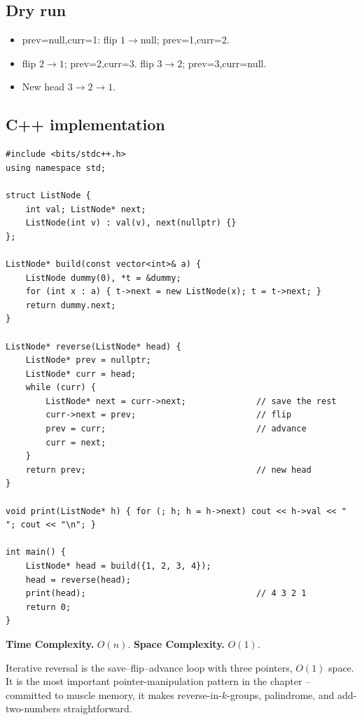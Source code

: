 \subsection*{Dry run}


\begin{itemize}
  \item prev=null,curr=1: flip $1\to$null; prev=1,curr=2.
  \item flip $2\to1$; prev=2,curr=3. flip $3\to2$; prev=3,curr=null.
  \item New head $3\to2\to1$.
\end{itemize}

\subsection*{C++ implementation}

\begin{lstlisting}
#include <bits/stdc++.h>
using namespace std;

struct ListNode {
    int val; ListNode* next;
    ListNode(int v) : val(v), next(nullptr) {}
};

ListNode* build(const vector<int>& a) {
    ListNode dummy(0), *t = &dummy;
    for (int x : a) { t->next = new ListNode(x); t = t->next; }
    return dummy.next;
}

ListNode* reverse(ListNode* head) {
    ListNode* prev = nullptr;
    ListNode* curr = head;
    while (curr) {
        ListNode* next = curr->next;              // save the rest
        curr->next = prev;                        // flip
        prev = curr;                              // advance
        curr = next;
    }
    return prev;                                  // new head
}

void print(ListNode* h) { for (; h; h = h->next) cout << h->val << " "; cout << "\n"; }

int main() {
    ListNode* head = build({1, 2, 3, 4});
    head = reverse(head);
    print(head);                                  // 4 3 2 1
    return 0;
}
\end{lstlisting}

\begin{complexitybox}
\textbf{Time Complexity.} $O(n)$. \textbf{Space Complexity.} $O(1)$.
\end{complexitybox}

\begin{takeawaybox}
Iterative reversal is the save--flip--advance loop with three pointers,
$O(1)$ space. It is the most important pointer-manipulation pattern in the
chapter -- committed to muscle memory, it makes reverse-in-$k$-groups,
palindrome, and add-two-numbers straightforward.
\end{takeawaybox}
